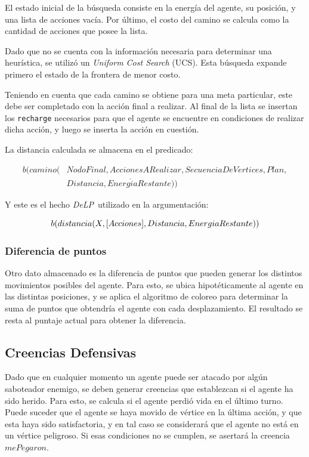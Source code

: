 \documentclass[oneside]{book}
\theoremstyle{definition}
\newcommand{\DLP}{\mbox{\textit{DeLP}}}
\newcommand{\lit}[1]{\mbox{$ #1$}}
\newcommand{\nlA}[1]{$$\mbox{#1}$$}
\begin{document}
El estado inicial de la búsqueda consiste en la energía del agente, su posición, y una 
lista de acciones vacía. Por último, el costo del camino se calcula como la cantidad de 
acciones que posee la lista.

Dado que no se cuenta con la información necesaria para determinar una heurística, se 
utilizó un \textit{Uniform Cost Search} (UCS). Esta búsqueda expande primero el estado
de la frontera de menor costo.

Teniendo en cuenta que cada camino se obtiene para una meta particular, este debe ser
completado con la acción final a realizar. Al final de la lista se insertan los 
\texttt{recharge} necesarios para que el agente se encuentre en condiciones de realizar 
dicha acción, y luego se inserta la acción en cuestión.

La distancia calculada se almacena en el predicado:

\begin{equation*}
\begin{aligned}
b(camino(&NodoFinal, AccionesARealizar, SecuenciaDeV\acute{e}rtices, Plan,\\
   &Distancia, Energ\acute{i}aRestante))
\end{aligned}
\end{equation*}

Y este es el hecho \DLP\ utilizado en la argumentación:

\nlA{\lit{b(distancia(X, [Acciones], Distancia, EnergiaRestante))}}

\subsubsection{Diferencia de puntos}

Otro dato almacenado es la diferencia de puntos que pueden generar los distintos
movimientos posibles del agente. Para esto, se ubica hipotéticamente al agente
en las distintas posiciones, y se aplica el algoritmo de coloreo para determinar
la suma de puntos que obtendría el agente con cada desplazamiento. El resultado
se resta al puntaje actual para obtener la diferencia.

\subsection{Creencias Defensivas}

Dado que en cualquier momento un agente puede ser atacado por algún saboteador 
enemigo, se deben generar creencias que establezcan si el agente ha sido herido.
Para esto, se calcula si el agente perdió vida en el último turno. Puede suceder
que el agente se haya movido de vértice en la última acción, y que esta haya sido
satisfactoria, y en tal caso se considerará que el agente no está en un vértice
peligroso. Si esas condiciones no se cumplen, se asertará la creencia 
\lit{mePegaron}.
\end{document}
